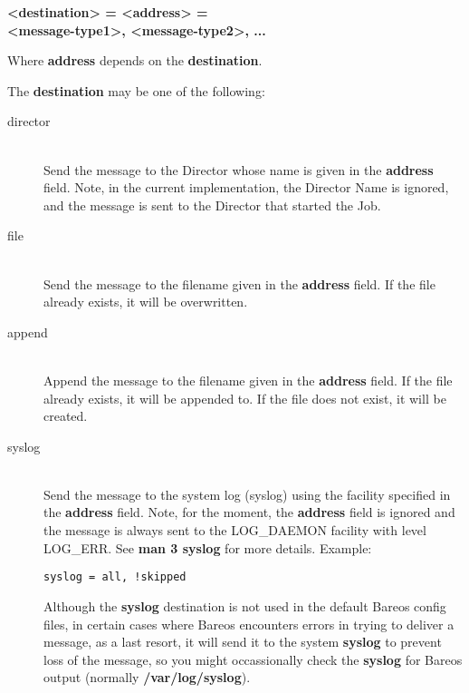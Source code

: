 \begin{description}
\item {\bf {\textless}destination{\textgreater} = {\textless}address{\textgreater} = \hfill \\
{\textless}message-type1{\textgreater}, {\textless}message-type2{\textgreater}, ...}

Where {\bf address} depends on the {\bf destination}.

The {\bf destination} may be one of the following:

\begin{description}

\item [director] \hfill \\
Send the message to the Director whose name  is given in the {\bf address}
field. Note, in the current  implementation, the Director Name is ignored, and
the message  is sent to the Director that started the Job.

\item [file] \hfill \\
Send the message to the filename given in  the {\bf address} field. If the
file already exists, it will be  overwritten.

\item [append] \hfill \\
Append the message to the filename given  in the {\bf address} field. If the
file already exists, it will  be appended to. If the file does not exist, it
will be created.

\item [syslog] \hfill \\
Send the message to the system log (syslog)  using the facility specified in
the {\bf address} field.  Note, for the moment, the {\bf address} field is
ignored  and the message is always sent to the LOG\_DAEMON facility with
level LOG\_ERR. See {\bf man 3 syslog} for more details. Example:

\begin{verbatim}
syslog = all, !skipped
\end{verbatim}

Although the {\bf syslog} destination is not used in the default Bareos
config files, in certain cases where Bareos encounters errors in trying
to deliver a message, as a last resort, it will send it to the system
{\bf syslog} to prevent loss of the message, so you might occassionally
check the {\bf syslog} for Bareos output (normally {\bf
/var/log/syslog}).


\end{description}
\end{description}
